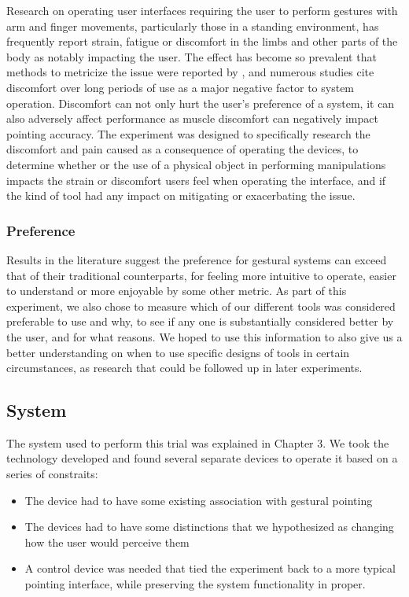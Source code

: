 Research on operating user interfaces requiring the user to perform gestures with arm and finger movements, particularly those in a standing environment, has frequently report strain, fatigue or discomfort in the limbs and other parts of the body as notably impacting the user. The effect has become so prevalent that methods to metricize the issue were reported by \cite{Hincapié-RamosEtAl2014}, and numerous studies cite discomfort over long periods of use as a major negative factor to system operation. Discomfort can not only hurt the user's preference of a system, it can also adversely affect performance as muscle discomfort can negatively impact pointing accuracy.
The experiment was designed to specifically research the discomfort and pain caused as a consequence of operating the devices, to determine whether or the use of a physical object in performing manipulations impacts the strain or discomfort users feel when operating the interface, and if the kind of tool had any impact on mitigating or exacerbating the issue.

\subsubsection{Preference}

Results in the literature suggest the preference for gestural systems can exceed that of their traditional counterparts, for feeling more intuitive to operate, easier to understand or more enjoyable by some other metric. As part of this experiment, we also chose to measure which of our different tools was considered preferable to use and why, to see if any one is substantially considered better by the user, and for what reasons. We hoped to use this information to also give us a better understanding on when to use specific designs of tools in certain circumstances, as research that could be followed up in later experiments.

\subsection{System}

The system used to perform this trial was explained in Chapter 3. We took the technology developed and found several separate devices to operate it based on a series of constraits:

\begin{itemize}
\item The device had to have some existing association with gestural pointing
\item The devices had to have some distinctions that we hypothesized as changing how the user would perceive them
\item A control device was needed that tied the experiment back to a more typical pointing interface, while preserving the system functionality in proper.
\end{itemize}

